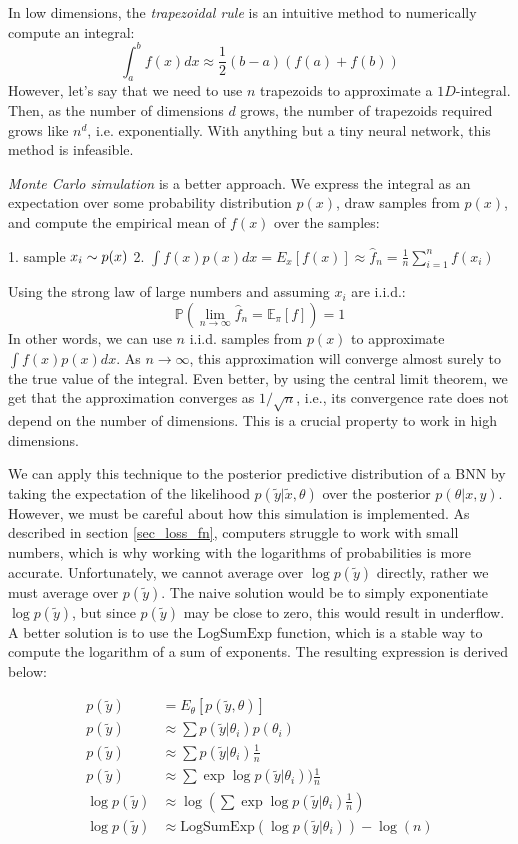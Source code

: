 \documentclass[12pt]{article}
\begin{document}
In low dimensions, the \textit{trapezoidal rule} is an intuitive method to numerically compute an integral:
$$
\int_{a}^{b} f(x) d x \approx \frac{1}{2}(b-a)(f(a)+f(b))
$$
However, let's say that we need to use $n$ trapezoids to approximate a $1D$-integral. Then, as the number of dimensions $d$ grows, the number of trapezoids required grows like $n^d$, i.e. exponentially. With anything but a tiny neural network, this method is infeasible.

\textit{Monte Carlo simulation} is a better approach. We express the integral as an expectation over some probability distribution $p(x)$, draw samples from $p(x)$, and compute the empirical mean of $f(x)$ over the samples:

1. sample $x_i \sim p(x)\\$
2. $\int f(x)p(x) dx = E_x[f(x)] \approx \hat{f}_n = \frac{1}{n} \sum_{i=1}^n f(x_i)$

Using the strong law of large numbers and assuming $x_i$ are i.i.d.:
$$
\mathbb{P}\left(\lim_{n \rightarrow \infty} \hat{f}_n=\mathbb{E}_{\pi}[f]\right)=1
$$
In other words, we can use $n$ i.i.d. samples from $p(x)$ to approximate $\int f(x)p(x) dx$. As $n \rightarrow \infty$, this approximation will converge almost surely to the true value of the integral. Even better, by using the central limit theorem, we get that the approximation converges as $1/\sqrt n$, i.e., its convergence rate does not depend on the number of dimensions. This is a crucial property to work in high dimensions.


We can apply this technique to the posterior predictive distribution of a BNN by taking the expectation of the likelihood $p(\tilde{y}|\tilde{x},\theta)$ over the posterior $p(\theta|x,y)$. However, we must be careful about how this simulation is implemented. As described in section \ref{sec_loss_fn}, computers struggle to work with small numbers, which is why working with the logarithms of probabilities is more accurate. Unfortunately, we cannot average over $\log p(\tilde{y})$ directly, rather we must average over $p(\tilde{y})$. The naive solution would be to simply exponentiate $\log p(\tilde{y})$, but since $p(\tilde{y})$ may be close to zero, this would result in underflow. A better solution is to use the $\textrm{LogSumExp}$ function, which is a stable way to compute the logarithm of a sum of exponents. The resulting expression is derived below:

\begin{align}
p(\tilde{y}) &= E_\theta [p(\tilde{y}, \theta)] \\
p(\tilde{y}) &\approx \sum p(\tilde{y}|\theta_i) p(\theta_i) \\
p(\tilde{y}) &\approx \sum p(\tilde{y}|\theta_i) \frac{1}{n} \\
p(\tilde{y}) &\approx \sum \exp \log p(\tilde{y}|\theta_i)) \frac{1}{n} \\
\log p(\tilde{y}) &\approx \log(\sum \exp \log p(\tilde{y}|\theta_i) \frac{1}{n}) \\
\log p(\tilde{y}) &\approx \textrm{LogSumExp} (\log p(\tilde{y}|\theta_i)) - \log(n)
\end{align}
\end{document}

